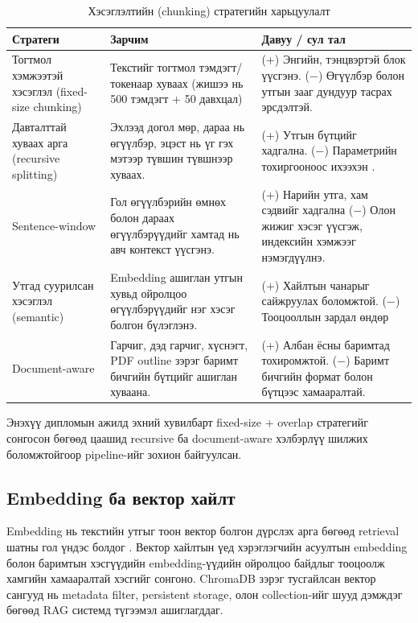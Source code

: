 \begin{table}[H]
\centering
\begin{tabular}{|p{2.8cm}|p{5.5cm}|p{5.5cm}|}
\hline
\textbf{Стратеги} & \textbf{Зарчим} & \textbf{Давуу / сул тал} \\ \hline
Тогтмол хэмжээтэй хэсэглэл
(fixed-size chunking) & Текстийг тогтмол тэмдэгт/токенаар хуваах (жишээ нь 500 тэмдэгт + 50 давхцал) & (+) Энгийн, тэнцвэртэй блок үүсгэнэ. ($-$) Өгүүлбэр болон утгын зааг дундуур тасрах эрсдэлтэй. \\ \hline
Давталттай хуваах арга
(recursive splitting) & Эхлээд догол мөр, дараа нь өгүүлбэр, эцэст нь үг гэх мэтээр түвшин түвшнээр хуваах. & (+) Утгын бүтцийг хадгална. ($-$) Параметрийн тохиргооноос ихээхэн . \\ \hline
Sentence-window & Гол өгүүлбэрийн өмнөх болон дараах өгүүлбэрүүдийг хамтад нь авч контекст үүсгэнэ. & (+) Нарийн утга, хам сэдвийг хадгална ($-$) Олон жижиг хэсэг үүсгэж, индексийн хэмжээг нэмэгдүүлнэ. \\ \hline
Утгад суурилсан хэсэглэл (semantic) & Embedding ашиглан утгын хувьд ойролцоо өгүүлбэрүүдийг нэг хэсэг болгон бүлэглэнэ. & (+) Хайлтын чанарыг сайжруулах боломжтой. ($-$) Тооцооллын зардал өндөр \\ \hline
Document-aware & Гарчиг, дэд гарчиг, хүснэгт, PDF outline зэрэг баримт бичгийн бүтцийг ашиглан хуваана. & (+) Албан ёсны баримтад тохиромжтой. ($-$) Баримт бичгийн формат болон бүтцээс хамааралтай. \\ \hline
\end{tabular}
\caption[Хэсэглэлтийн стратегийн харьцуулалт]{Хэсэглэлтийн (chunking) стратегийн харьцуулалт}
\label{tab:chunking}
\end{table}


Энэхүү дипломын ажилд эхний хувилбарт fixed-size + overlap стратегийг сонгосон бөгөөд цаашид recursive ба document-aware хэлбэрлүү шилжих боломжтойгоор pipeline-ийг зохион байгуулсан.

\subsection{Embedding ба вектор хайлт}

Embedding нь текстийн утгыг тоон вектор болгон дүрслэх арга бөгөөд retrieval шатны гол үндэс болдог \cite{sentence_bert, dpr}. Вектор хайлтын үед хэрэглэгчийн асуултын embedding болон баримтын хэсгүүдийн embedding-үүдийн ойролцоо байдлыг тооцоолж хамгийн хамааралтай хэсгийг сонгоно. ChromaDB \cite{chromadb} зэрэг тусгайлсан вектор сангууд нь metadata filter, persistent storage, олон collection-ийг шууд дэмждэг бөгөөд RAG системд түгээмэл ашиглагддаг.

